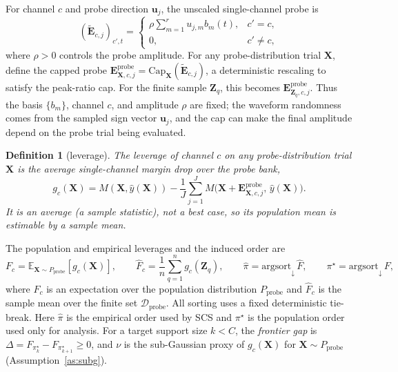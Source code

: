 \documentclass[11pt]{article}
\newtheorem{definition}{Definition}
\begin{document}
For channel $c$ and probe direction $\mathbf{u}_j$, the unscaled single-channel probe is
\[
(\widetilde{\mathbf{E}}_{c,j})_{c',t}=
\begin{cases}
\rho\sum_{m=1}^{r}u_{j,m}b_m(t), & c'=c,\\
0, & c'\neq c,
\end{cases}
\]
where $\rho>0$ controls the probe amplitude. For any probe-distribution trial
$\mathbf{X}$, define the capped probe
$\mathbf{E}^{\mathrm{probe}}_{\mathbf{X},c,j}=\mathrm{Cap}_{\mathbf{X}}
(\widetilde{\mathbf{E}}_{c,j})$, a deterministic rescaling to satisfy the peak-ratio cap.
For the finite sample $\mathbf{Z}_q$, this becomes
$\mathbf{E}^{\mathrm{probe}}_{\mathbf{Z}_q,c,j}$. Thus the basis $\{b_m\}$, channel $c$,
and amplitude $\rho$ are fixed; the waveform randomness comes from the sampled sign
vector $\mathbf{u}_j$, and the cap can make the final amplitude depend on the probe trial
being evaluated.
\begin{definition}[leverage]\label{def:lev}
The leverage of channel $c$ on any probe-distribution trial $\mathbf{X}$ is the average
single-channel margin drop over the probe bank,
\[
g_c(\mathbf{X})=M(\mathbf{X},\hat y(\mathbf{X}))-\frac{1}{J}\sum_{j=1}^{J}
M\!\big(\mathbf{X}+\mathbf{E}^{\mathrm{probe}}_{\mathbf{X},c,j},\,\hat y(\mathbf{X})\big).
\]
It is an \emph{average} (a sample statistic), not a best case, so its population mean is
estimable by a sample mean.
\end{definition}
The population and empirical leverages and the induced order are
\[
F_c=\mathbb{E}_{\mathbf{X}\sim P_{\mathrm{probe}}}[g_c(\mathbf{X})],\qquad
\widehat F_c=\frac1n\sum_{q=1}^{n} g_c(\mathbf{Z}_q),\qquad
\widehat\pi=\text{argsort}_{\downarrow}\,\widehat F,\qquad
\pi^\star=\text{argsort}_{\downarrow}\,F,
\]
where $F_c$ is an expectation over the population distribution $P_{\mathrm{probe}}$ and
$\widehat F_c$ is the sample mean over the finite set $\mathcal{D}_{\mathrm{probe}}$.
All sorting uses a fixed deterministic tie-break. Here $\widehat\pi$ is the empirical
order used by SCS and $\pi^\star$ is the population order used only for analysis. For a
target support size $k<C$, the \emph{frontier gap} is
$\Delta=F_{\pi^\star_k}-F_{\pi^\star_{k+1}}\ge 0$, and $\nu$ is the sub-Gaussian proxy of
$g_c(\mathbf{X})$ for $\mathbf{X}\sim P_{\mathrm{probe}}$
(Assumption~\ref{as:subg}).
\end{document}
